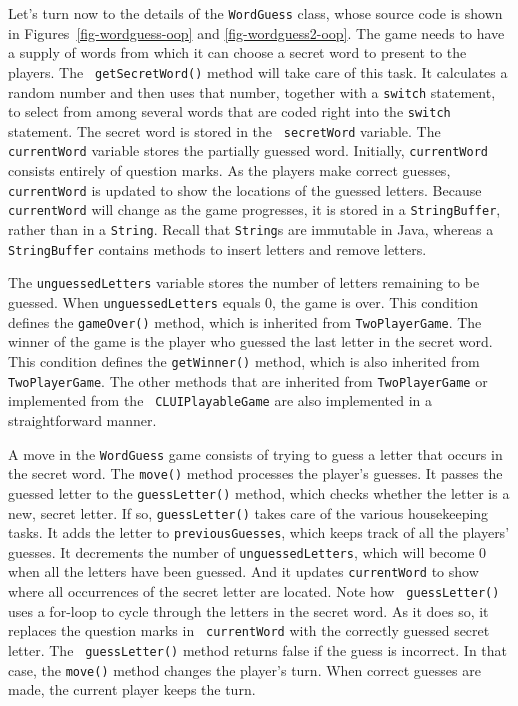 Let's turn now to the details of the {\tt WordGuess} class, whose
source code is shown in Figures~\ref{fig-wordguess-oop} and
\ref{fig-wordguess2-oop}.  The game needs to have a supply of words from
which it can choose a secret word to present to the players.  The {\tt
getSecretWord()} method will take care of this task. It calculates a
random number and then uses that number, together with a {\tt switch}
statement, to select from among several words that are coded right into
the {\tt switch} statement.  The secret word is stored in the {\tt
secretWord} variable.  The {\tt currentWord} variable stores the
partially guessed word. Initially, {\tt currentWord} consists entirely
of question marks.  As the players make correct guesses, {\tt
currentWord} is updated to show the locations of the guessed letters.
Because {\tt currentWord} will change as the game progresses, it is
stored in a {\tt StringBuffer}, rather than in a {\tt String}. Recall
that {\tt String}s are immutable in Java, whereas a {\tt StringBuffer}
contains methods to insert letters and remove letters.

The {\tt unguessedLetters} variable stores the number of letters
remaining to be guessed.  When {\tt unguessedLetters} equals 0, the
game is over.  This condition defines the {\tt gameOver()}
method, which is inherited from {\tt TwoPlayerGame}.  The winner of
the game is the player who guessed the last letter in the secret word.
This condition defines the {\tt getWinner()} method, which
is also inherited from {\tt TwoPlayerGame}. The other methods that are
inherited from {\tt TwoPlayerGame} or implemented from the {\tt
CLUIPlayableGame} are also implemented in a straightforward manner.

A move in the {\tt WordGuess} game consists of trying to guess a
letter that occurs in the secret word. The {\tt move()} method
processes the player's guesses. It passes the guessed letter to the
{\tt guessLetter()} method, which checks whether the letter is a new,
secret letter. If so, {\tt guessLetter()} takes care of the various
housekeeping tasks. It adds the letter to {\tt previousGuesses},
which keeps track of all the players' guesses.  It decrements the
number of {\tt unguessedLetters}, which will become 0 when all the
letters have been guessed. And it updates {\tt currentWord} to show
where all occurrences of the secret letter are located.  Note how {\tt
guessLetter()} uses a for-loop to cycle through the letters in the
secret word. As it does so, it replaces the question marks in {\tt
currentWord} with the correctly guessed secret letter.  The {\tt
guessLetter()} method returns false if the guess is incorrect.  In
that case, the {\tt move()} method changes the player's turn.  When
correct guesses are made, the current player keeps the turn.

